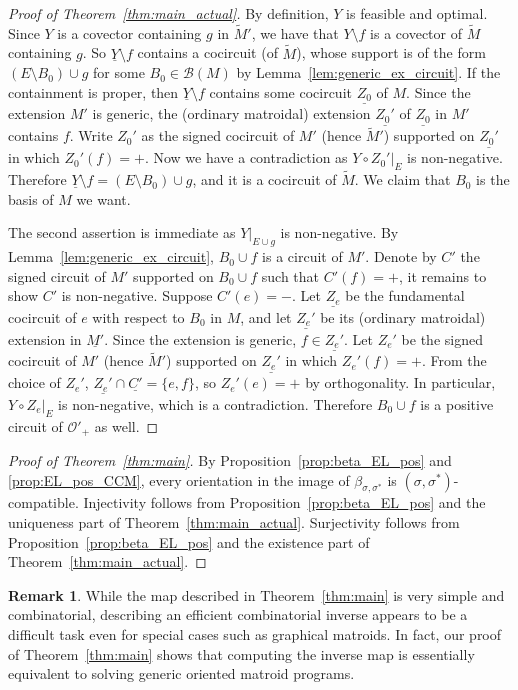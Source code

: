 \documentclass[12pt]{amsart}
\numberwithin{equation}{section}
\theoremstyle{definition}
\newtheorem{remark}[theorem]{Remark}
\newcommand{\Bcal}{{\mathcal B}}
\newcommand{\Ocal}{{\mathcal O}}
\newcommand{\chiho}[1]{\todo[color=green!30]{\rm #1 \\ \hfill --- Ch.}}
\begin{document}
\begin{proof}[Proof of Theorem~\ref{thm:main_actual}]
By definition, $Y$ is feasible and optimal. Since $Y$ is a covector containing $g$ in $\widetilde{M}'$, we have that $Y\setminus f$ is a covector of $\widetilde{M}$ containing $g$. So $\underline{Y}\setminus f$ contains a cocircuit (of $\widetilde{M}$), whose support is of the form $(E\setminus B_0)\cup g$ for some $B_0\in\Bcal(M)$ by Lemma~\ref{lem:generic_ex_circuit}. If the containment is proper, then $\underline{Y}\setminus f$ contains some cocircuit $\underline{Z_0}$ of $M$. Since the extension $M'$ is generic, the (ordinary matroidal) extension $\underline{Z_0'}$ of $\underline{Z_0}$ in $M'$ contains $f$. Write $Z_0'$ as the signed cocircuit of $M'$ (hence $\widetilde{M}'$) supported on $\underline{Z_0'}$ in which $Z_0'(f)=+$. Now we have a contradiction as $Y\circ Z_0'|_E$ is non-negative. Therefore $\underline{Y}\setminus f=(E\setminus B_0)\cup g$, and it is a cocircuit of $\widetilde{M}$. We claim that $B_0$ is the basis of $M$ we want.

The second assertion is immediate as $Y|_{E\cup g}$ is non-negative. By Lemma~\ref{lem:generic_ex_circuit}, $B_0\cup f$ is a circuit of $M'$. Denote by $C'$ the signed circuit of $M'$ supported on $B_0\cup f$ such that $C'(f)=+$, it remains to show $C'$ is non-negative. Suppose $C'(e)=-$. Let $\underline{Z_e}$ be the fundamental cocircuit of $e$ with respect to $B_0$ in $M$, and let $\underline{Z_e'}$ be its (ordinary matroidal) extension in $\underline{M'}$. Since the extension is generic, $f\in\underline{Z_e'}$.
Let $Z_e'$ be the signed cocircuit of $M'$ (hence $\widetilde{M}'$) supported on $\underline{Z_e'}$ in which $Z_e'(f)=+$. From the choice of $Z_e'$, $\underline{Z_e'}\cap\underline{C'}=\{e,f\}$, so $Z_e'(e)=+$ by orthogonality. In particular, $Y\circ Z_e|_E$ is non-negative, which is a contradiction. Therefore $B_0\cup f$ is a positive circuit of $\Ocal'_+$ as well.
\end{proof}

\begin{proof}[Proof of Theorem~\ref{thm:main}]
By Proposition~\ref{prop:beta_EL_pos} and \ref{prop:EL_pos_CCM}, every orientation in the image of $\beta_{\sigma,\sigma^*}$ is $(\sigma,\sigma^*)$-compatible. Injectivity follows from Proposition~\ref{prop:beta_EL_pos} and the uniqueness part of Theorem~\ref{thm:main_actual}. Surjectivity follows from Proposition~\ref{prop:beta_EL_pos} and the existence part of Theorem~\ref{thm:main_actual}.
\end{proof}

\begin{remark}
While the map described in Theorem~\ref{thm:main} is very simple and combinatorial, describing an efficient combinatorial inverse appears to be a difficult task even for special cases such as graphical matroids.
In fact, our proof of Theorem~\ref{thm:main} shows that computing the inverse map is essentially equivalent to solving generic oriented matroid programs.
\end{remark}
\end{document}
